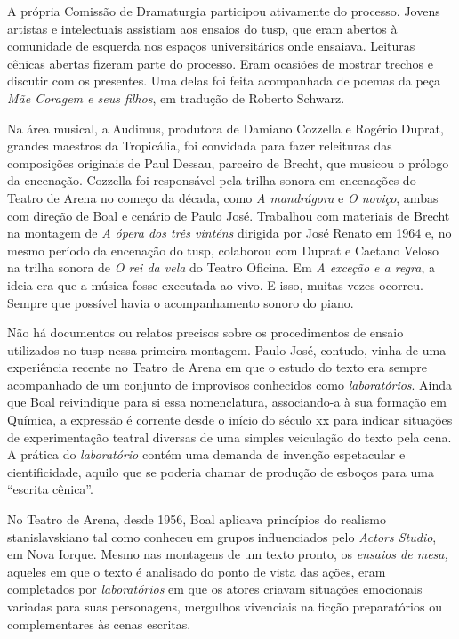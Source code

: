 A própria Comissão de Dramaturgia participou ativamente do processo.
Jovens artistas e intelectuais assistiam aos ensaios do {\sc tusp}, que eram
abertos à comunidade de esquerda nos espaços universitários onde
ensaiava. Leituras cênicas abertas fizeram parte do processo. Eram
ocasiões de mostrar trechos e discutir com os presentes. Uma delas foi
feita acompanhada de poemas da peça {\it Mãe Coragem e seus filhos}, em
tradução de Roberto Schwarz.

Na área musical, a Audimus, produtora de Damiano Cozzella e Rogério
Duprat, grandes maestros da Tropicália, foi convidada para fazer
releituras das composições originais de Paul Dessau, parceiro de Brecht,
que musicou o prólogo da encenação. Cozzella foi responsável pela trilha
sonora em encenações do Teatro de Arena no começo da década, como {\it A
mandrágora} e {\it O noviço}, ambas com direção de Boal e cenário de
Paulo José. Trabalhou com materiais de Brecht na montagem de {\it A
ópera dos três vinténs} dirigida por José Renato em 1964 e, no mesmo
período da encenação do {\sc tusp}, colaborou com Duprat e Caetano Veloso na
trilha sonora de {\it O rei da vela} do Teatro Oficina. Em {\it A
exceção e a regra}, a ideia era que a música fosse executada ao vivo. E
isso, muitas vezes ocorreu. Sempre que possível havia o acompanhamento
sonoro do piano.

\subject{Ensaios e laboratórios}

Não há documentos ou relatos precisos sobre os procedimentos de ensaio
utilizados no {\sc tusp} nessa primeira montagem. Paulo José, contudo, vinha
de uma experiência recente no Teatro de Arena em que o estudo do texto
era sempre acompanhado de um conjunto de improvisos conhecidos como
{\it laboratórios}. Ainda que Boal reivindique para si essa
nomenclatura, associando-a à sua formação em Química, a expressão é
corrente desde o início do século {\sc xx} para indicar situações de
experimentação teatral diversas de uma simples veiculação do texto pela
cena. A prática do {\it laboratório} contém uma demanda de invenção
espetacular e cientificidade, aquilo que se poderia chamar de produção
de esboços para uma “escrita cênica”.

No Teatro de Arena, desde 1956, Boal aplicava princípios do realismo
stanislavskiano tal como conheceu em grupos influenciados pelo
{\it Actors Studio}, em Nova Iorque. Mesmo nas montagens de um texto
pronto, os {\it ensaios de mesa,} aqueles em que o texto é analisado do
ponto de vista das ações, eram completados por {\it laboratórios} em que
os atores criavam situações emocionais variadas para suas personagens,
mergulhos vivenciais na ficção preparatórios ou complementares às cenas
escritas.

